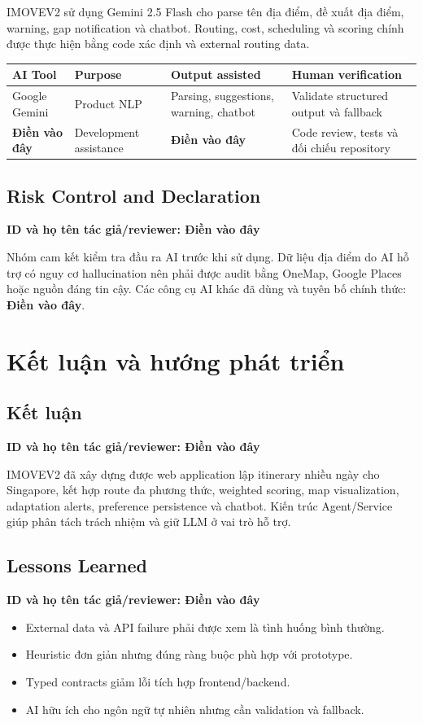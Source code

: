 \documentclass[12pt,a4paper]{article}
\newcommand{\dienvao}{\textbf{Điền vào đây}}
\newcommand{\tacgia}{%
  \begin{tcolorbox}[colback=blue!3,colframe=blue!25,boxrule=0.4pt,arc=1mm]
    \small\textbf{ID và họ tên tác giả/reviewer: Điền vào đây}
  \end{tcolorbox}
}
\begin{document}
IMOVEV2 sử dụng Gemini 2.5 Flash cho parse tên địa điểm, đề xuất địa điểm, warning, gap notification và chatbot. Routing, cost, scheduling và scoring chính được thực hiện bằng code xác định và external routing data.

\begin{longtable}{|L{3.0cm}|L{3.5cm}|L{4.5cm}|L{4.0cm}|}
\hline
\textbf{AI Tool} & \textbf{Purpose} & \textbf{Output assisted} & \textbf{Human verification} \\ \hline
\endhead
Google Gemini & Product NLP & Parsing, suggestions, warning, chatbot & Validate structured output và fallback \\ \hline
\dienvao & Development assistance & \dienvao & Code review, tests và đối chiếu repository \\ \hline
\end{longtable}

\subsection{Risk Control and Declaration}
\tacgia

Nhóm cam kết kiểm tra đầu ra AI trước khi sử dụng. Dữ liệu địa điểm do AI hỗ trợ có nguy cơ hallucination nên phải được audit bằng OneMap, Google Places hoặc nguồn đáng tin cậy. Các công cụ AI khác đã dùng và tuyên bố chính thức: \dienvao.

\section{Kết luận và hướng phát triển}

\subsection{Kết luận}
\tacgia

IMOVEV2 đã xây dựng được web application lập itinerary nhiều ngày cho Singapore, kết hợp route đa phương thức, weighted scoring, map visualization, adaptation alerts, preference persistence và chatbot. Kiến trúc Agent/Service giúp phân tách trách nhiệm và giữ LLM ở vai trò hỗ trợ.

\subsection{Lessons Learned}
\tacgia

\begin{itemize}
    \item External data và API failure phải được xem là tình huống bình thường.
    \item Heuristic đơn giản nhưng đúng ràng buộc phù hợp với prototype.
    \item Typed contracts giảm lỗi tích hợp frontend/backend.
    \item AI hữu ích cho ngôn ngữ tự nhiên nhưng cần validation và fallback.
\end{itemize}
\end{document}
